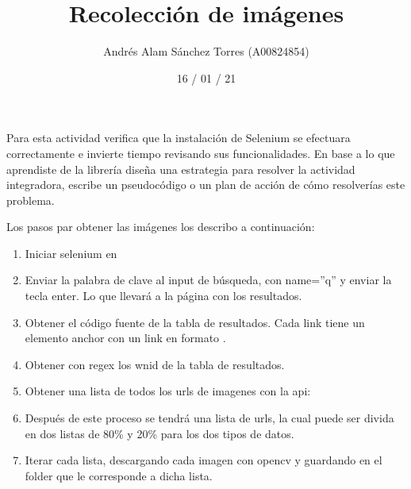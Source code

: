 \documentclass[]{article}
\title{\textbf{Recolección de imágenes}}
\date{\small 16 / 01 / 21}
\author{\small Andrés Alam Sánchez Torres (A00824854)}
\begin{document}
\maketitle

\noindent    
Para esta actividad verifica que la instalación de Selenium se efectuara correctamente e invierte
tiempo revisando sus funcionalidades. En base a lo que aprendiste de la librería diseña una estrategia para
resolver la actividad integradora, escribe un pseudocódigo o un plan de acción de cómo resolverías este
problema.

\medspace

Los pasos par obtener las imágenes los describo a continuación:

    \begin{enumerate}
        \item Iniciar selenium en 
        \item Enviar la palabra de clave al input de búsqueda, con name=''q'' y enviar la tecla enter. Lo que llevará
        a la página con los resultados.
        \item Obtener el código fuente de la tabla de resultados. Cada link tiene un elemento anchor con un link en 
        formato . 
        \item Obtener con regex los wnid de la tabla de resultados.
        \item Obtener una lista de todos los urls de imagenes con la api: \\
        \item Después de este proceso se tendrá una lista de urls, la cual puede ser divida en dos 
        listas de 80\% y 20\% para los dos tipos de datos.
        \item Iterar cada lista, descargando cada imagen con opencv y guardando en el folder que le corresponde a 
        dicha lista.
        
    \end{enumerate}
\end{document}
